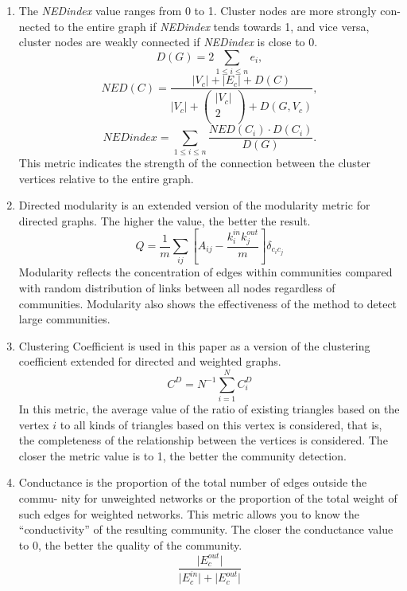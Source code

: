 \begin{enumerate}
	\item The \textit{NEDindex} \cite{Rahman} value ranges from 0 to 1. Cluster nodes are more strongly con- nected to the entire graph if \textit{NEDindex} tends towards 1, and vice versa, cluster nodes are weakly connected if \textit{NEDindex} is close to 0. \[D(G) = 2 \sum_{1 \le i \le n}e_i,\] \[\textit{NED}(C) = \frac{\lvert V_c \rvert + \lvert E_c \rvert + D(C)}{\lvert V_c \rvert + \begin{pmatrix}
			\lvert V_c \rvert \\
			2 \\
	\end{pmatrix} + D(G,V_c)},\] \begin{equation} 
		\label{eqn:52} 
		\textit{NEDindex} = \sum_{1 \le i \le n} \frac{\textit{NED}(C_i) \cdot D(C_i)}{D(G)}. 
	\end{equation} This metric indicates the strength of the connection between the cluster vertices relative to the entire graph.
	
	\item Directed modularity \cite{LeichtNewman} is an extended version of the modularity metric \cite{Newman} for directed graphs. The higher the value, the better the result. \begin{equation}
		\label{eqn:53} 
		Q = \frac{1}{m} \sum_{ij}\left[A_{ij} - \frac{k^{in}_i k^{out}_j}{m}\right]\delta_{c_ic_j}
	\end{equation} Modularity reflects the concentration of edges within communities compared with random distribution of links between all nodes regardless of communities. Modularity also shows the effectiveness of the method to detect large communities.

	\item Clustering Coefficient is used in this paper as a version of the clustering coefficient \cite{Fagiolo} extended for directed and weighted graphs. \begin{equation}
		\label{eqn:54} 
		C^D = N^{-1} \sum_{i=1}^{N} C_i^D
	\end{equation} In this metric, the average value of the ratio of existing triangles based on the vertex \(i\) to all kinds of triangles based on this vertex is considered, that is, the completeness of the relationship between the vertices is considered. The closer the metric value is to 1, the better the community detection.

	\item Conductance \cite{ChenNguyenSzymanski} is the proportion of the total number of edges outside the commu- nity for unweighted networks or the proportion of the total weight of such edges for weighted networks. This metric allows you to know the “conductivity” of the resulting community. The closer the conductance value to 0, the better the quality of the community. \begin{equation}
		\label{eqn:55}
		\frac{\lvert E_c^{out} \rvert}{\lvert E_c^{in} \rvert + \lvert E_c^{out} \rvert}
	\end{equation}


\end{enumerate}
